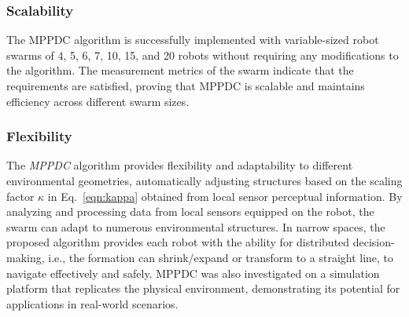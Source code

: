 \subsubsection{Scalability}
The MPPDC algorithm is successfully implemented with variable-sized robot swarms of 4, 5, 6, 7, 10, 15, and 20 robots without requiring any modifications to the algorithm. The measurement metrics of the swarm indicate that the requirements are satisfied, proving that MPPDC is scalable and maintains efficiency across different swarm sizes. 

\subsubsection{Flexibility}
The \textit{MPPDC} algorithm provides flexibility and adaptability to different environmental geometries, automatically adjusting structures based on the scaling factor $\kappa$ in Eq.~\eqref{eqn:kappa} obtained from local sensor perceptual information. By analyzing and processing data from local sensors equipped on the robot, the swarm can adapt to numerous environmental structures. In narrow spaces, the proposed algorithm provides each robot with the ability for distributed decision-making, i.e., the formation can shrink/expand or transform to a straight line, to navigate effectively and safely. MPPDC was also investigated on a simulation platform that replicates the physical environment, demonstrating its potential for applications in real-world scenarios.
